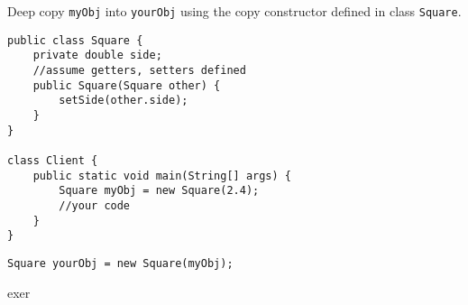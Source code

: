 \begin{exercise}
Deep copy \texttt{myObj} into \texttt{yourObj} using the copy constructor defined in class \texttt{Square}. 

\begin{lstlisting}[frame=single,style=buggy]
public class Square {
	private double side;
	//assume getters, setters defined
	public Square(Square other) {
		setSide(other.side);
	}
}

class Client {
	public static void main(String[] args) {
		Square myObj = new Square(2.4);
		//your code
	}
}
\end{lstlisting}  	
\end{exercise}
\begin{answer} \begin{lstlisting}
Square yourObj = new Square(myObj);
\end{lstlisting} \end{answer}

exer
